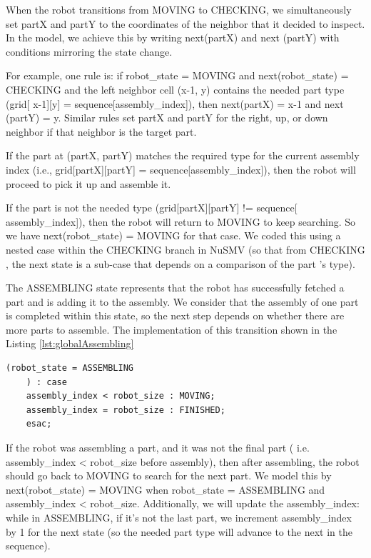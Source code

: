 When the robot transitions from MOVING to CHECKING, we simultaneously set 
partX and partY to the coordinates of the neighbor that it decided to 
inspect. In the model, we achieve this by writing next(partX) and next
(partY) with conditions mirroring the state change. 

For example, one rule is: if robot\_state = MOVING and next(robot\_state) = CHECKING and 
the left neighbor cell (x-1, y) contains the needed part type (grid[
x-1][y] = sequence[assembly\_index]), then next(partX) = x-1 and next
(partY) = y. Similar rules set partX and partY for the right, up, 
or down neighbor if that neighbor is the target part. 

If the part at (partX, partY) matches the required type for the current 
assembly index (i.e., grid[partX][partY] = sequence[assembly\_index]), 
then the robot will proceed to pick it up and assemble it.  

If the part is not the needed type (grid[partX][partY] != sequence[
assembly\_index]), then the robot will return to MOVING to keep searching. 
So we have next(robot\_state) = MOVING for that case. We coded this using 
a nested case within the CHECKING branch in NuSMV (so that from CHECKING
, the next state is a sub-case that depends on a comparison of the part
’s type).

The ASSEMBLING state represents that the robot 
has successfully fetched a part and is adding it to the assembly. 
We consider that the assembly of one part is completed within this state,
so the next step depends on whether there are more parts to assemble. 
The implementation of this transition shown in the Listing \ref{lst:globalAssembling}

\begin{lstlisting}[language=NuSMV, caption={Assign for transitions from ASSEMBLING state}, 
    label={lst:globalAssembling}]
    (robot_state = ASSEMBLING
    ) : case 
    assembly_index < robot_size : MOVING;
    assembly_index = robot_size : FINISHED;
    esac;
\end{lstlisting}

If the robot was assembling a part, and it was not the final part (
i.e. assembly\_index < robot\_size before assembly), then after assembling, 
the robot should go back to MOVING to search for the next part. We 
model this by next(robot\_state) = MOVING when robot\_state = ASSEMBLING and 
assembly\_index < robot\_size. Additionally, we will update the assembly\_index: while 
in ASSEMBLING, if it’s not the last part, we increment assembly\_index by 
1 for the next state (so the needed part type will advance to the next 
in the sequence).

